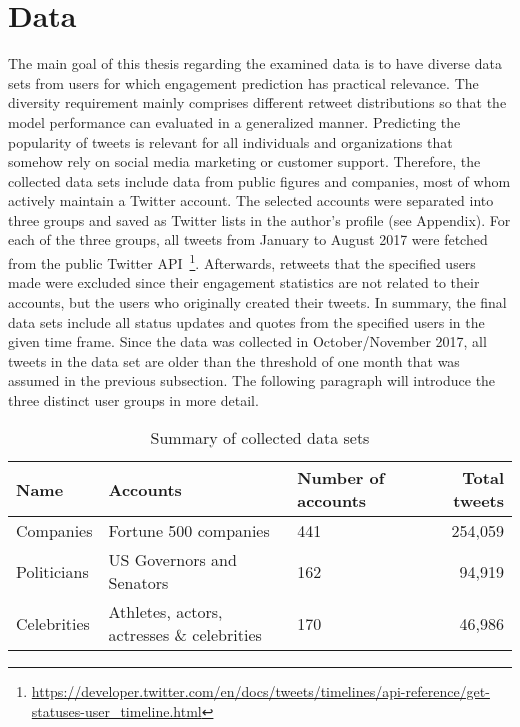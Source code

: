 \section{Data}
\label{sec:data_collection}

The main goal of this thesis regarding the examined data is to have diverse
data sets from users for which engagement prediction has practical relevance.
The diversity requirement mainly comprises different retweet distributions
so that the model performance can evaluated in a generalized manner.
Predicting the popularity of tweets is relevant for all individuals and
organizations that somehow rely on social media marketing or customer support.
Therefore, the collected data sets include data from public figures and
companies, most of whom actively maintain a Twitter account.
The selected accounts were separated into three groups and saved as Twitter lists
in the author's profile (see Appendix).
For each of the three groups, all tweets from January to August 2017 were
fetched from the public Twitter API~\footnote{\url{https://developer.twitter.com/en/docs/tweets/timelines/api-reference/get-statuses-user_timeline.html}}.
Afterwards, retweets that the specified users made were excluded since their
engagement statistics are not related to their accounts, but the users who
originally created their tweets.
In summary, the final data sets include all status updates and quotes from the
specified users in the given time frame.
Since the data was collected in October/November 2017, all tweets in the data
set are older than the threshold of one month that was assumed in the previous
subsection.
The following paragraph will introduce the three distinct user groups in more
detail.

\begin{table}
\centering
\begin{tabular}{lllr}
\toprule
Name & Accounts & Number of accounts & Total tweets \\
\midrule
Companies & Fortune 500 companies & 441 & 254,059 \\
Politicians & US Governors and Senators & 162 & 94,919 \\
Celebrities & Athletes, actors, actresses \& celebrities & 170 & 46,986 \\
\bottomrule
\end{tabular}
\caption{Summary of collected data sets}
\label{tab:dataset_summary}
\end{table}

